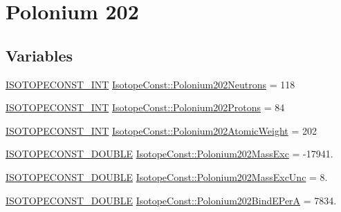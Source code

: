\hypertarget{group___isotope_const-_polonium-_po202}{}\section{Polonium 202}
\label{group___isotope_const-_polonium-_po202}
\subsection*{Variables}
\begin{DoxyCompactItemize}
\item 
\mbox{\hyperlink{group___isotope_const-_macros_ga5f18360b3e99483a35c32d789e62621c}{I\+S\+O\+T\+O\+P\+E\+C\+O\+N\+S\+T\+\_\+\+I\+NT}} \mbox{\hyperlink{group___isotope_const-_polonium-_po202_gab95e5c5490b9e3a590d3fe24fb986ae6}{Isotope\+Const\+::\+Polonium202\+Neutrons}} = 118
\item 
\mbox{\hyperlink{group___isotope_const-_macros_ga5f18360b3e99483a35c32d789e62621c}{I\+S\+O\+T\+O\+P\+E\+C\+O\+N\+S\+T\+\_\+\+I\+NT}} \mbox{\hyperlink{group___isotope_const-_polonium-_po202_gab538bcee29a1b1dbc044bd161586a816}{Isotope\+Const\+::\+Polonium202\+Protons}} = 84
\item 
\mbox{\hyperlink{group___isotope_const-_macros_ga5f18360b3e99483a35c32d789e62621c}{I\+S\+O\+T\+O\+P\+E\+C\+O\+N\+S\+T\+\_\+\+I\+NT}} \mbox{\hyperlink{group___isotope_const-_polonium-_po202_gaf75a6c8de0769ac6010bed72f51eb6ca}{Isotope\+Const\+::\+Polonium202\+Atomic\+Weight}} = 202
\item 
\mbox{\hyperlink{group___isotope_const-_macros_ga8f45a7272ce02c0b4c65c44636ed719a}{I\+S\+O\+T\+O\+P\+E\+C\+O\+N\+S\+T\+\_\+\+D\+O\+U\+B\+LE}} \mbox{\hyperlink{group___isotope_const-_polonium-_po202_ga72e467c19e1c1fd6b2fa5bfdf911a4b8}{Isotope\+Const\+::\+Polonium202\+Mass\+Exc}} = -\/17941.
\item 
\mbox{\hyperlink{group___isotope_const-_macros_ga8f45a7272ce02c0b4c65c44636ed719a}{I\+S\+O\+T\+O\+P\+E\+C\+O\+N\+S\+T\+\_\+\+D\+O\+U\+B\+LE}} \mbox{\hyperlink{group___isotope_const-_polonium-_po202_ga3b93a33c79bbe2e8ade32634bd0a4950}{Isotope\+Const\+::\+Polonium202\+Mass\+Exc\+Unc}} = 8.
\item 
\mbox{\hyperlink{group___isotope_const-_macros_ga8f45a7272ce02c0b4c65c44636ed719a}{I\+S\+O\+T\+O\+P\+E\+C\+O\+N\+S\+T\+\_\+\+D\+O\+U\+B\+LE}} \mbox{\hyperlink{group___isotope_const-_polonium-_po202_ga5c00d10617e1c50c52d0c1ccc061504b}{Isotope\+Const\+::\+Polonium202\+Bind\+E\+PerA}} = 7834.
\item 

\end{DoxyCompactItemize}
